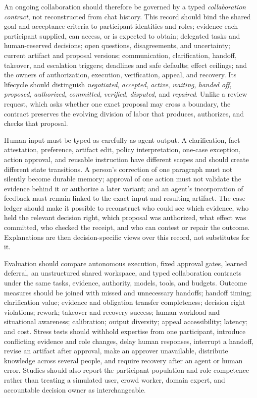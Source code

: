 An ongoing collaboration should therefore be governed by a typed \emph{collaboration contract}, not reconstructed from chat history. This record should bind the shared goal and acceptance criteria to participant identities and roles; evidence each participant supplied, can access, or is expected to obtain; delegated tasks and human-reserved decisions; open questions, disagreements, and uncertainty; current artifact and proposal versions; communication, clarification, handoff, takeover, and escalation triggers; deadlines and safe defaults; effect ceilings; and the owners of authorization, execution, verification, appeal, and recovery. Its lifecycle should distinguish \emph{negotiated}, \emph{accepted}, \emph{active}, \emph{waiting}, \emph{handed off}, \emph{proposed}, \emph{authorized}, \emph{committed}, \emph{verified}, \emph{disputed}, and \emph{repaired}. Unlike a review request, which asks whether one exact proposal may cross a boundary, the contract preserves the evolving division of labor that produces, authorizes, and checks that proposal.

Human input must be typed as carefully as agent output. A clarification, fact attestation, preference, artifact edit, policy interpretation, one-case exception, action approval, and reusable instruction have different scopes and should create different state transitions. A person's correction of one paragraph must not silently become durable memory; approval of one action must not validate the evidence behind it or authorize a later variant; and an agent's incorporation of feedback must remain linked to the exact input and resulting artifact. The case ledger should make it possible to reconstruct who could see which evidence, who held the relevant decision right, which proposal was authorized, what effect was committed, who checked the receipt, and who can contest or repair the outcome. Explanations are then decision-specific views over this record, not substitutes for it.

Evaluation should compare autonomous execution, fixed approval gates, learned deferral, an unstructured shared workspace, and typed collaboration contracts under the same tasks, evidence, authority, models, tools, and budgets. Outcome measures should be joined with missed and unnecessary handoffs; handoff timing; clarification value; evidence and obligation transfer completeness; decision right violations; rework; takeover and recovery success; human workload and situational awareness; calibration; output diversity; appeal accessibility; latency; and cost. Stress tests should withhold expertise from one participant, introduce conflicting evidence and role changes, delay human responses, interrupt a handoff, revise an artifact after approval, make an approver unavailable, distribute knowledge across several people, and require recovery after an agent or human error. Studies should also report the participant population and role competence rather than treating a simulated user, crowd worker, domain expert, and accountable decision owner as interchangeable.

